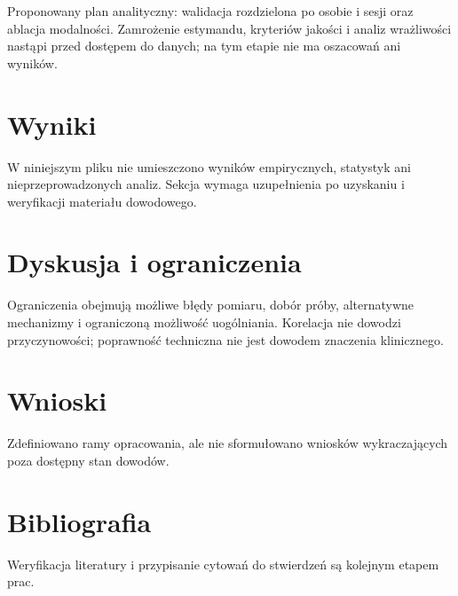 \documentclass[11pt,a4paper]{article}
\begin{document}
Proponowany plan analityczny: walidacja rozdzielona po osobie i sesji oraz ablacja modalności. Zamrożenie estymandu, kryteriów jakości i analiz wrażliwości nastąpi przed dostępem do danych; na tym etapie nie ma oszacowań ani wyników.

\section{Wyniki}

W niniejszym pliku nie umieszczono wyników empirycznych, statystyk ani nieprzeprowadzonych analiz. Sekcja wymaga uzupełnienia po uzyskaniu i weryfikacji materiału dowodowego.

\section{Dyskusja i ograniczenia}

Ograniczenia obejmują możliwe błędy pomiaru, dobór próby, alternatywne mechanizmy i ograniczoną możliwość uogólniania. Korelacja nie dowodzi przyczynowości; poprawność techniczna nie jest dowodem znaczenia klinicznego.

\section{Wnioski}

Zdefiniowano ramy opracowania, ale nie sformułowano wniosków wykraczających poza dostępny stan dowodów.

\section*{Bibliografia}

Weryfikacja literatury i przypisanie cytowań do stwierdzeń są kolejnym etapem prac.
\end{document}
